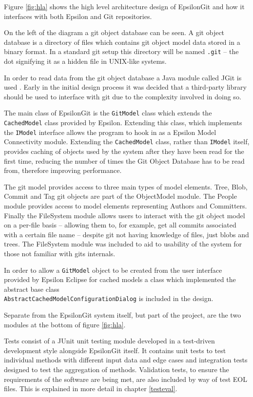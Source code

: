 \documentclass[11pt]{book}
\newcommand{\code}[1]{\texttt{#1}}
\begin{document}
Figure \ref{fig:hla} shows the high level architecture design of EpsilonGit and how it interfaces with both Epsilon and Git repositories.

On the left of the diagram a git object database can be seen. A git object database is a directory of files which contains git object model data stored in a binary format. In a standard git setup this directory will be named \code{.git} -- the dot signifying it as a hidden file in UNIX-like systems.

In order to read data from the git object database a Java module called JGit is used \cite{jgit}. Early in the initial design process it was decided that a third-party library should be used to interface with git due to the complexity involved in doing so. 

The main class of EpsilonGit is the \code{GitModel} class which extends the \code{CachedModel} class provided by Epsilon. Extending this class, which implements the \code{IModel} interface allows the program to hook in as a Epsilon Model Connectivity module. Extending the \code{CachedModel} class, rather than \code{IModel} itself, provides caching of objects used by the system after they have been read for the first time, reducing the number of times the Git Object Database has to be read from, therefore improving performance.

The git model provides access to three main types of model elements. Tree, Blob, Commit and Tag git objects are part of the ObjectModel module. The People module provides access to model elements representing Authors and Committers. Finally the FileSystem module allows users to interact with the git object model on a per-file basis -- allowing them to, for example, get all commits associated with a certain file name -- despite git not having knowledge of files, just blobs and trees. The FileSystem module was included to aid to usability of the system for those not familiar with gits internals.

In order to allow a \code{GitModel} object to be created from the user interface provided by Epsilon Eclipse for cached models a class which implemented the abstract base class \\ \code{AbstractCachedModelConfigurationDialog} is included in the design.

Separate from the EpsilonGit system itself, but part of the project, are the two modules at the bottom of figure \ref{fig:hla}. 

Tests consist of a JUnit \cite{junit} unit testing module developed in a test-driven development style alongside EpsilonGit itself. It contains unit tests to test individual methods with different input data and edge cases and integration tests designed to test the aggregation of methods. Validation tests, to ensure the requirements of the software are being met, are also included by way of test EOL files. This is explained in more detail in chapter \ref{testeval}.
\end{document}
